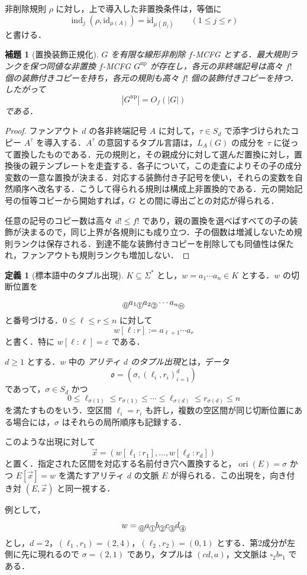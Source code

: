 \documentclass[11pt,a4paper]{ltjsarticle}
\numberwithin{equation}{section}
\theoremstyle{plain}
\newtheorem{lemma}[theorem]{補題}
\theoremstyle{definition}
\newtheorem{definition}[theorem]{定義}
\theoremstyle{remark}
\newcommand{\tuple}[1]{\vec{#1}}
\newcommand{\blank}{\square}
\newcommand{\eps}{\varepsilon}
\newcommand{\cutpos}[1]{%
  \raisebox{-0.7ex}{%
    \tikz[baseline=(char.base)]{%
      \node[draw,circle,inner sep=0.4pt,font=\scriptsize]
        (char) {\ensuremath{#1}};%
    }%
  }%
}
\begin{document}
非削除規則 $\rho$ に対し，上で導入した非置換条件は，等価に
\[
  \operatorname{ind}_j(\rho,\mathrm{id}_{\mu(A)})
  =\mathrm{id}_{\mu(B_j)}
  \qquad(1\le j\le r)
\]
と書ける．

\begin{lemma}[置換装飾正規化]
\label{lem:permutation-decoration}
$G$ を有限な線形非削除 $f$-MCFG とする．最大規則ランクを保つ同値な非置換 $f$-MCFG $G^{\mathrm{np}}$ が存在し，各元の非終端記号は高々 $f!$ 個の装飾付きコピーを持ち，各元の規則も高々 $f!$ 個の装飾付きコピーを持つ．したがって
\[
  |G^{\mathrm{np}}|=O_f(|G|)
\]
である．
\end{lemma}

\begin{proof}
ファンアウト $d$ の各非終端記号 $A$ に対して，$\tau\in S_d$ で添字づけられたコピー $A^\tau$ を導入する．$A^\tau$ の意図するタプル言語は，$L_A(G)$ の成分を $\tau$ に従って置換したものである．元の規則と，その親成分に対して選んだ置換に対し，置換後の親テンプレートを走査する．各子について，この走査によりその子の成分変数の一意な置換が決まる．対応する装飾付き子記号を使い，それらの変数を自然順序へ改名する．こうして得られる規則は構成上非置換的である．元の開始記号の恒等コピーから開始すれば，$G$ との間に導出ごとの対応が得られる．

任意の記号のコピー数は高々 $d!\le f!$ であり，親の置換を選べばすべての子の装飾が決まるので，同じ上界が各規則にも成り立つ．子の個数は増減しないため規則ランクは保存される．到達不能な装飾付きコピーを削除しても同値性は保たれ，ファンアウトも規則ランクも増加しない．
\end{proof}

\begin{definition}[標本語中のタプル出現]
\label{def:tuple-occurrence}
$K\subseteq\Sigma^*$ とし，$w=a_1\cdots a_n\in K$ とする．$w$ の切断位置を
\[
\cutpos{0}a_1\cutpos{1}a_2\cutpos{2}\cdots a_n\cutpos{n}
\]
と番号づける．$0\le\ell\le r\le n$ に対して
\[
w[\ell:r]:=a_{\ell+1}\cdots a_r
\]
と書く．特に $w[\ell:\ell]=\eps$ である．

$d\ge1$ とする．$w$ 中の \emph{アリティ $d$ のタプル出現}とは，データ
\[
\mathfrak{o}=(\sigma,(\ell_i,r_i)_{i=1}^d)
\]
であって，$\sigma\in S_d$ かつ
\[
  0\le\ell_{\sigma(1)}\le r_{\sigma(1)}
  \le\cdots\le\ell_{\sigma(d)}\le r_{\sigma(d)}\le n
\]
を満たすものをいう．空区間 $\ell_i=r_i$ も許し，複数の空区間が同じ切断位置にある場合には，$\sigma$ はそれらの局所順序も記録する．

このような出現に対して
\[
\tuple x=(w[\ell_1:r_1],\ldots,w[\ell_d:r_d])
\]
と置く．指定された区間を対応する名前付き穴へ置換すると，$\operatorname{ori}(E)=\sigma$ かつ $E[\tuple x]=w$ を満たすアリティ $d$ の文脈 $E$ が得られる．この出現を，向き付き対 $(E,\tuple x)$ と同一視する．

例として，
\[
w=\cutpos{0}a\cutpos{1}b\cutpos{2}c\cutpos{3}d\cutpos{4}
\]
とし，$d=2$，$(\ell_1,r_1)=(2,4)$，$(\ell_2,r_2)=(0,1)$ とする．第2成分が左側に先に現れるので $\sigma=(2,1)$ であり，タプルは $(cd,a)$，文文脈は $\blank_2b\blank_1$ である．
\end{definition}
\end{document}
